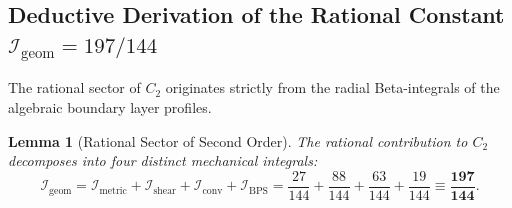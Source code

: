 \documentclass[12pt,a4paper]{article}
\newtheorem{lemma}{Lemma}
\begin{document}
	\subsection{Deductive Derivation of the Rational Constant $\mathcal{I}_{\text{geom}} = 197/144$}
	The rational sector of $C_2$ originates strictly from the radial Beta-integrals of the algebraic boundary layer profiles.
	
	\begin{lemma}[Rational Sector of Second Order]
		The rational contribution to $C_2$ decomposes into four distinct mechanical integrals:
		\begin{equation}
			\mathcal{I}_{\mathrm{geom}} = \mathcal{I}_{\mathrm{metric}} + \mathcal{I}_{\mathrm{shear}} + \mathcal{I}_{\mathrm{conv}} + \mathcal{I}_{\mathrm{BPS}} = \frac{27}{144} + \frac{88}{144} + \frac{63}{144} + \frac{19}{144} \equiv \mathbf{\frac{197}{144}}.
		\end{equation}
	\end{lemma}
	
\end{document}
